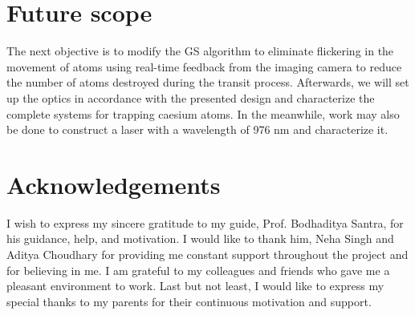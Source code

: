 \documentclass[11pt,a4paper]{article}
\begin{document}
\section{Future scope}
\label{sec:scope}
The next objective is to modify the GS algorithm to eliminate flickering in the movement of atoms using real-time feedback from the imaging camera to reduce the number of atoms destroyed during the transit process. Afterwards, we will set up the optics in accordance with the presented design and characterize the complete systems for trapping caesium atoms. In the meanwhile, work may also be done to construct a laser with a wavelength of 976 nm and characterize it.


\section*{Acknowledgements}
 I wish to express my sincere gratitude to my guide, Prof. Bodhaditya Santra, for his guidance, help, and motivation. I would like to thank him, Neha Singh and Aditya Choudhary for providing me constant support throughout the project and for believing in me.
 I am grateful to my colleagues and friends who gave me a pleasant environment to work. Last but not least, I would like to express my special thanks to my parents for their continuous motivation and support.


% 



\end{document}
